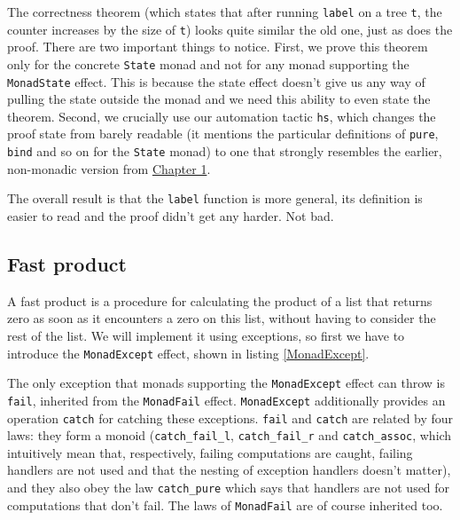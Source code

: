 \documentclass[declaration,inz,english,shortabstract]{iithesis}
\newcommand{\m}[1]{\texttt{#1}}
\begin{document}
The correctness theorem (which states that after running \m{label} on a tree \m{t}, the counter increases by the size of \m{t}) looks quite similar the old one, just as does the proof. There are two important things to notice. First, we prove this theorem only for the concrete \m{State} monad and not for any monad supporting the \m{MonadState} effect. This is because the state effect doesn't give us any way of pulling the state outside the monad and we need this ability to even state the theorem. Second, we crucially use our automation tactic \m{hs}, which changes the proof state from barely readable (it mentions the particular definitions of \m{pure}, \m{bind} and so on for the \m{State} monad) to one that strongly resembles the earlier, non-monadic version from \hyperref[ch1]{Chapter 1}.

The overall result is that the \m{label} function is more general, its definition is easier to read and the proof didn't get any harder. Not bad.


\subsection{Fast product}

A fast product is a procedure for calculating the product of a list that returns zero as soon as it encounters a zero on this list, without having to consider the rest of the list. We will implement it using exceptions, so first we have to introduce the \m{MonadExcept} effect, shown in listing \ref{MonadExcept}.


The only exception that monads supporting the \m{MonadExcept} effect can throw is \m{fail}, inherited from the \m{MonadFail} effect. \m{MonadExcept} additionally provides an operation \m{catch} for catching these exceptions. \m{fail} and \m{catch} are related by four laws: they form a monoid (\m{catch\_fail\_l}, \m{catch\_fail\_r} and \m{catch\_assoc}, which intuitively mean that, respectively, failing computations are caught, failing handlers are not used and that the nesting of exception handlers doesn't matter), and they also obey the law \m{catch\_pure} which says that handlers are not used for computations that don't fail. The laws of \m{MonadFail} are of course inherited too.
\end{document}
